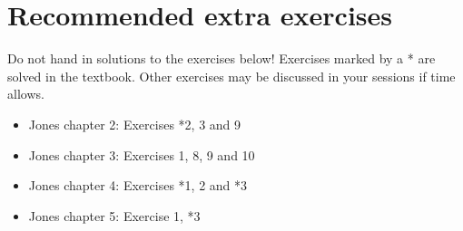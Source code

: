 \documentclass[12pt,a4paper]{article}
\begin{document}
\section*{Recommended extra exercises }
Do not hand in solutions to the exercises below! Exercises marked by a * are solved in the textbook. Other exercises may be discussed in your sessions if time allows. 

\begin{itemize}
    \item Jones chapter 2: Exercises *2, 3 and 9
    \item Jones chapter 3: Exercises 1, 8, 9 and 10
    \item Jones chapter 4: Exercises *1, 2 and *3 
    \item Jones chapter 5: Exercise 1, *3
\end{itemize}
\end{document}
